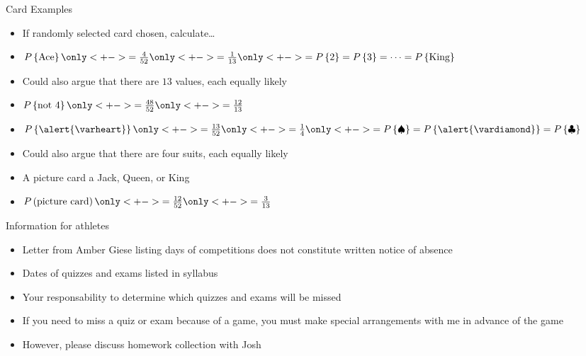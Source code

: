 \documentclass[handout]{beamer}
\theoremstyle{definition}
\begin{document}
\begin{frame}{Card Examples}
\begin{itemize}
\item If randomly selected card chosen, calculate\dots
\item $P\left\{\text{Ace}\right\}\only<+->{=\frac{4}{52}}
\only<+->{=\frac{1}{13}}
\only<+->{=P\left\{2\right\}=P\left\{3\right\}
=\cdots=P\left\{\text{King}\right\}}$
\item Could also argue that there are $13$ values, each equally likely
\item $P\left\{\text{not $4$}\right\}\only<+->{=\frac{48}{52}
\only<+->{=\frac{12}{13}}}$
\item $P\left\{\alert{\varheart}\right\}
\only<+->{=\frac{13}{52}}\only<+->{=\frac{1}{4}}
\only<+->{=P\left\{\spadesuit\right\}
=P\left\{\alert{\vardiamond}\right\}
=P\left\{\clubsuit\right\}}$
\item Could also argue that there are four suits, each equally likely
\item A \alert{picture card} a Jack, Queen, or King
\item $P\left(\text{picture card}\right)
\only<+->{=\frac{12}{52}}
\only<+->{=\frac{3}{13}}$
\end{itemize}
\end{frame}

\begin{frame}{Information for athletes}
\begin{itemize}
\item Letter from Amber Giese listing
days of competitions does \alert{not} constitute
written notice of absence
\item Dates of quizzes and exams listed in syllabus
\item \alert{Your responsability} to determine which
quizzes and exams will be missed
\item If you need to miss a quiz or exam because of a game, \alert{you must}
make special arrangements with me in advance of the game
\item However, please discuss homework collection with Josh
\end{itemize}
\end{frame}
\end{document}
